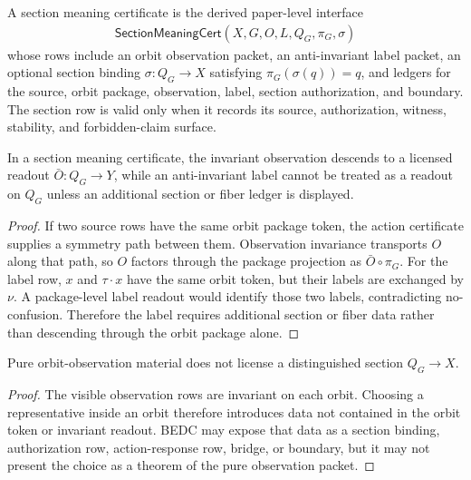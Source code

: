 \begin{definition}
\label{def:philosophy-section-meaning-certificate}
A section meaning certificate is the derived paper-level interface
$$
\begin{gathered}
\mathsf{SectionMeaningCert}(X,G,O,L,Q_G,\pi_G,\sigma)
\end{gathered}
$$
whose rows include an orbit observation packet, an anti-invariant label
packet, an optional section binding
$\sigma:Q_G\to X$ satisfying $\pi_G(\sigma(q))=q$, and ledgers for the
source, orbit package, observation, label, section authorization, and
boundary. The section row is valid only when it records its source,
authorization, witness, stability, and forbidden-claim surface.
\end{definition}

\begin{theorem}
\label{thm:philosophy-observation-descends-labels-need-not}
In a section meaning certificate, the invariant observation descends to
a licensed readout $\bar O:Q_G\to Y$, while an anti-invariant label
cannot be treated as a readout on $Q_G$ unless an additional section or
fiber ledger is displayed.
\end{theorem}
\begin{proof}
If two source rows have the same orbit package token, the action
certificate supplies a symmetry path between them. Observation
invariance transports $O$ along that path, so $O$ factors through the
package projection as $\bar O\circ\pi_G$. For the label row, $x$ and
$\tau\cdot x$ have the same orbit token, but their labels are exchanged
by $\nu$. A package-level label readout would identify those two
labels, contradicting no-confusion. Therefore the label requires
additional section or fiber data rather than descending through the
orbit package alone.
\end{proof}


\begin{corollary}
\label{cor:philosophy-no-hidden-section-from-pure-observation}
Pure orbit-observation material does not license a distinguished
section $Q_G\to X$.
\end{corollary}
\begin{proof}
The visible observation rows are invariant on each orbit. Choosing a
representative inside an orbit therefore introduces data not contained
in the orbit token or invariant readout. BEDC may expose that data as a
section binding, authorization row, action-response row, bridge, or
boundary, but it may not present the choice as a theorem of the pure
observation packet.
\end{proof}

